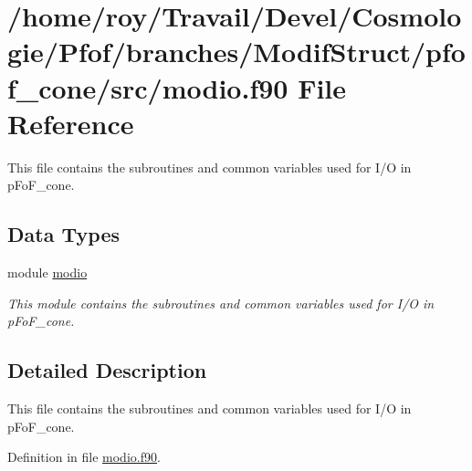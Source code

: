\hypertarget{modio_8f90}{\section{/home/roy/\-Travail/\-Devel/\-Cosmologie/\-Pfof/branches/\-Modif\-Struct/pfof\-\_\-cone/src/modio.f90 File Reference}
\label{modio_8f90}
}


This file contains the subroutines and common variables used for I/\-O in p\-Fo\-F\-\_\-cone.  


\subsection*{Data Types}
\begin{DoxyCompactItemize}
\item 
module \hyperlink{classmodio}{modio}
\begin{DoxyCompactList}\small\item\em This module contains the subroutines and common variables used for I/\-O in p\-Fo\-F\-\_\-cone. \end{DoxyCompactList}\end{DoxyCompactItemize}


\subsection{Detailed Description}
This file contains the subroutines and common variables used for I/\-O in p\-Fo\-F\-\_\-cone. 

Definition in file \hyperlink{modio_8f90_source}{modio.\-f90}.

